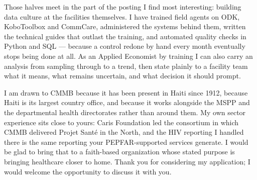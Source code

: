 \documentclass[11pt,a4paper,sans]{moderncv}
\begin{document}
Those halves meet in the part of the posting I find most interesting: building data culture at the facilities themselves. I have trained field agents on ODK, KoboToolbox and CommCare, administered the systems behind them, written the technical guides that outlast the training, and automated quality checks in Python and SQL --- because a control redone by hand every month eventually stops being done at all. As an Applied Economist by training I can also carry an analysis from sampling through to a trend, then state plainly to a facility team what it means, what remains uncertain, and what decision it should prompt.

I am drawn to CMMB because it has been present in Haiti since 1912, because Haiti is its largest country office, and because it works alongside the MSPP and the departmental health directorates rather than around them. My own sector experience sits close to yours: Caris Foundation led the consortium in which CMMB delivered Projet Santé in the North, and the HIV reporting I handled there is the same reporting your PEPFAR-supported services generate. I would be glad to bring that to a faith-based organization whose stated purpose is bringing healthcare closer to home. Thank you for considering my application; I would welcome the opportunity to discuss it with you.

\makeletterclosing
\end{document}
